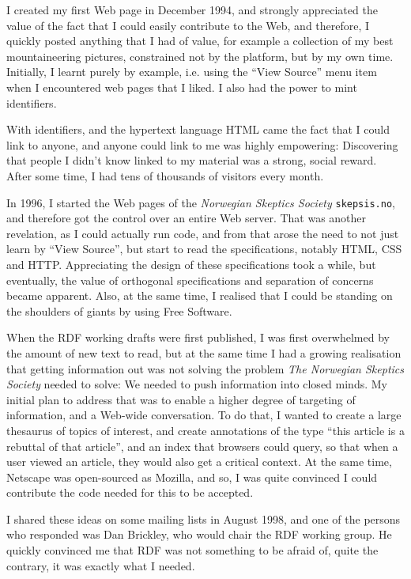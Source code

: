 I created my first Web page in December 1994, and strongly appreciated
the value of the fact that I could easily contribute to the Web, and
therefore, I quickly posted anything that I had of value, for example
a collection of my best mountaineering pictures, constrained not by
the platform, but by my own time. Initially, I learnt purely by
example, i.e. using the ``View Source'' menu item when I encountered
web pages that I liked. I also had the power to mint identifiers. 

With identifiers, and the hypertext language HTML came the fact that I
could link to anyone, and anyone could link to me was highly
empowering: Discovering that people I didn't know linked to my
material was a strong, social reward. After some time, I had tens of
thousands of visitors every month.

In 1996, I started the Web pages of the \textit{Norwegian Skeptics Society}
\texttt{skepsis.no}, and therefore got the control over an entire Web
server. That was another revelation, as I could actually run code, and
from that arose the need to not just learn by ``View Source'', but
start to read the specifications, notably HTML, CSS and
HTTP. Appreciating the design of these specifications took a while,
but eventually, the value of orthogonal specifications and separation
of concerns became apparent. Also, at the same time, I realised that I
could be standing on the shoulders of giants by using Free Software.

When the RDF working drafts were first published, I was first
overwhelmed by the amount of new text to read, but at the same time I
had a growing realisation that getting information out was not solving
the problem \textit{The Norwegian Skeptics Society} needed to solve: We needed
to push information into closed minds. My initial plan to address that
was to enable a higher degree of targeting of information, and a Web-wide
conversation. To do that, I wanted to create a large thesaurus of
topics of interest, and create annotations of the type ``this article
is a rebuttal of that article'', and an index that browsers could
query, so that when a user viewed an article, they would also get a
critical context. At the same time, Netscape was open-sourced as
Mozilla, and so, I was quite convinced I could contribute the code
needed for this to be accepted. 

I shared these ideas on some mailing lists in August 1998, and one of
the persons who responded was Dan Brickley, who would chair the RDF
working group. He quickly convinced me that RDF was not something to
be afraid of, quite the contrary, it was exactly what I needed.

